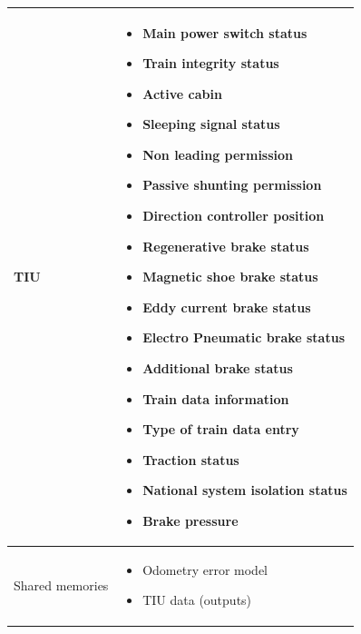 \documentclass[nocc]{template/openetcs_report}
\begin{document}
\begin{longtable}{|l|l|}
					\begin{minipage}[t]{0.35\linewidth} TIU	\end{minipage} 
				&	\begin{minipage}[t]{0.65\linewidth}
						\begin{itemize}
							\item Main power switch status
							\item Train integrity status
							\item Active cabin
							\item Sleeping signal status
							\item Non leading permission
							\item Passive shunting permission
							\item Direction controller position
							\item Regenerative brake status
							\item Magnetic shoe brake status
							\item Eddy current brake status
							\item Electro Pneumatic brake status
							\item Additional brake status
							\item Train data information
							\item Type of train data entry
							\item Traction status
							\item National system isolation status
							\item Brake pressure
						\end{itemize}			
					\end{minipage} \\
				
				\hline	
				
					\begin{minipage}[t]{0.35\linewidth} Shared memories	\end{minipage} 
				&	\begin{minipage}[t]{0.65\linewidth}
						\begin{itemize}
							\item Odometry error model
							\item TIU data (outputs)
						\end{itemize}				
					\end{minipage} \\
				
				\hline	
			\end{longtable}	
\end{document}
